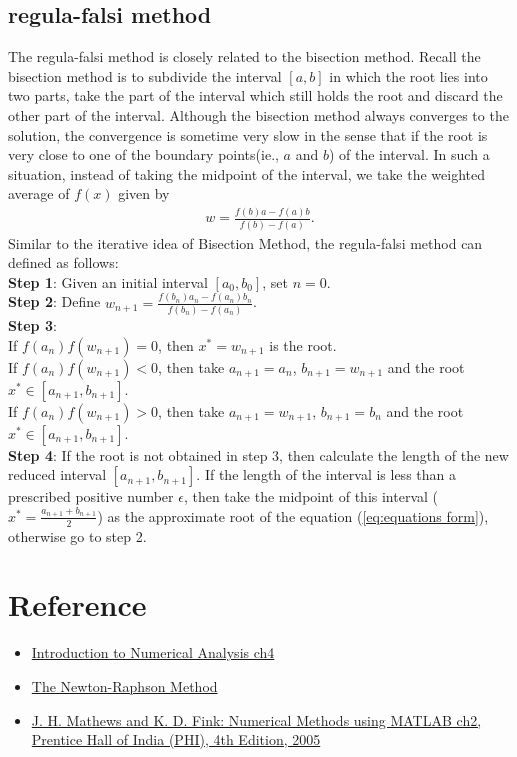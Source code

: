 \subsection{regula-falsi method}
The regula-falsi method is closely related to the bisection method. Recall the 
bisection method is to subdivide the interval $[a,b]$ in which the root lies into 
two parts, take the part of the interval which still holds the root and discard the other part of 
the interval. Although the bisection method always converges to the solution, the convergence is 
sometime very slow in the sense that if the root is very close to one of the boundary points(ie., $a$ and $b$)
of the interval. In such a situation, instead of taking the midpoint of the interval, 
we take the weighted average of $f(x)$ given by
\begin{align*}
    w=\frac{f(b)a-f(a)b}{f(b)-f(a)}.
\end{align*}
Similar to the iterative idea of Bisection Method, the regula-falsi method can defined as follows:\\
\textbf{Step 1}: Given an initial interval $[a_0,b_0]$, set $n=0$.\\
\textbf{Step 2}: Define $w_{n+1}=\frac{f(b_n)a_n-f(a_n)b_n}{f(b_n)-f(a_n)}$.\\
\textbf{Step 3}:\\
If $f(a_n)f(w_{n+1})=0$, then $x^*=w_{n+1}$ is the root.\\
If $f(a_n)f(w_{n+1})<0$, then take $a_{n+1}=a_n$, $b_{n+1}=w_{n+1}$ and the root $x^*\in [a_{n+1},b_{n+1}]$.\\
If $f(a_n)f(w_{n+1})>0$, then take $a_{n+1}=w_{n+1}$, $b_{n+1}=b_n$ and the root $x^*\in [a_{n+1},b_{n+1}]$.
\\
\textbf{Step 4}: If the root is not obtained in step 3, then calculate the length of the new reduced interval $[a_{n+1},b_{n+1}]$.
If the length of the interval is less than a prescribed positive number $\epsilon$,
then take the midpoint of this interval ($x^*=\frac{a_{n+1}+b_{n+1}}{2}$) as the approximate root of the equation (\ref{eq:equations form}),
otherwise go to step 2.


\section{Reference}
\begin{itemize}
    \item \href{https://www.math.iitb.ac.in/~baskar/book.pdf}{Introduction to Numerical Analysis ch4}
    \item \href{https://personal.math.ubc.ca/~anstee/math104/newtonmethod.pdf}{The Newton-Raphson Method}
    \item \href{}{J. H. Mathews and K. D. Fink: Numerical Methods using
    MATLAB ch2, Prentice Hall of India (PHI), 4th Edition, 2005} 
\end{itemize}